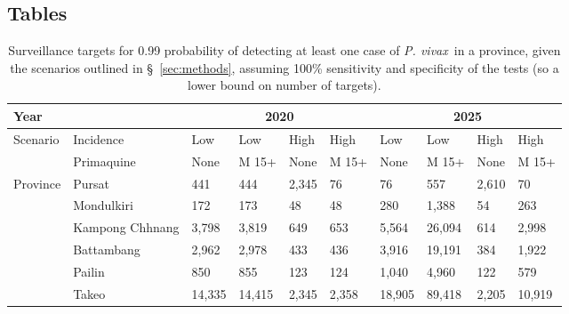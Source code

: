 \documentclass[doublespacing]{bmcart}
\newcommand{\pv}{\textit{P. vivax}}
\begin{document}
\begin{backmatter}

\section*{Tables}
\begin{table}[p] 
\caption{Surveillance targets for 0.99 probability of detecting at least one case of \pv~in a province, given the scenarios outlined in \S~\ref{sec:methods}, assuming 100\% sensitivity and specificity of the tests (so a lower bound on number of targets).}\label{tab:surveillance}
      \begin{tabular}{|l|l|l|l|l|l|l|l|l|l|}
       \hline 
       \multicolumn{2}{|l|}{Year} & \multicolumn{4}{|c|}{2020} & \multicolumn{4}{|c|}{2025} \\ \hline
       \multirow{2}{*}{Scenario} & Incidence & Low & Low & High & High & Low & Low & High & High \\ %
                                 & Primaquine & None & M 15+ & None & M 15+ & None & M 15+ & None & M 15+ \\ \hline
    \multirow{6}{*}{Province} & Pursat & 441 & 444 & 2,345 & 76 & 76 & 557 & 2,610 & 70 \\ %
                              & Mondulkiri & 172 & 173 & 48 & 48 & 280 & 1,388 & 54 & 263 \\ %
                              & Kampong Chhnang & 3,798 & 3,819 & 649 & 653 & 5,564 & 26,094 & 614 & 2,998 \\ %
                              & Battambang & 2,962 & 2,978 & 433 & 436 & 3,916 & 19,191 & 384 & 1,922 \\ %
                              & Pailin & 850 & 855 & 123 & 124 & 1,040 & 4,960 & 122 & 579 \\ %
                              & Takeo & 14,335 & 14,415 & 2,345 & 2,358 & 18,905 & 89,418 & 2,205 & 10,919 \\ \hline 
      \end{tabular}
\end{table}



\end{backmatter}
\end{document}
